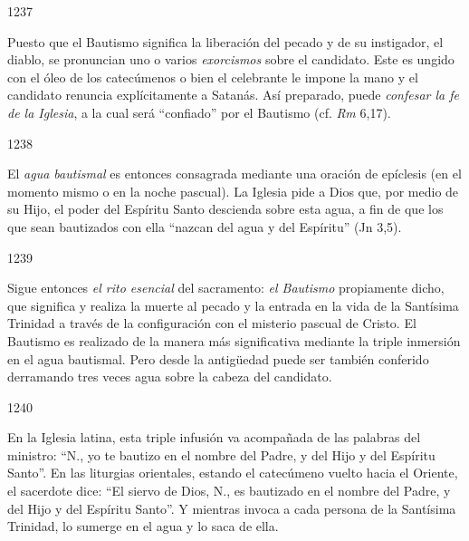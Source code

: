 			\begin{ccebody}\begin{ccenumber}1237\end{ccenumber} Puesto que el Bautismo significa la liberación del pecado y de su instigador, el diablo, se pronuncian uno o varios \textit{exorcismos} sobre el candidato. Este es ungido con el óleo de los catecúmenos o bien el celebrante le impone la mano y el candidato renuncia explícitamente a Satanás. Así preparado, puede \textit{confesar la fe de la Iglesia}, a la cual será “confiado” por el Bautismo (cf. \textit{Rm} 6,17).\end{ccebody}
			
			\begin{ccebody}\begin{ccenumber}1238\end{ccenumber} El \textit{agua bautismal} es entonces consagrada mediante una oración de epíclesis (en el momento mismo o en la noche pascual). La Iglesia pide a Dios que, por medio de su Hijo, el poder del Espíritu Santo descienda sobre esta agua, a fin de que los que sean bautizados con ella “nazcan del agua y del Espíritu” (Jn 3,5).\end{ccebody}
			
			\begin{ccebody}\begin{ccenumber}1239\end{ccenumber} Sigue entonces \textit{el rito esencial} del sacramento: \textit{el Bautismo} propiamente dicho, que significa y realiza la muerte al pecado y la entrada en la vida de la Santísima Trinidad a través de la configuración con el misterio pascual de Cristo. El Bautismo es realizado de la manera más significativa mediante la triple inmersión en el agua bautismal. Pero desde la antigüedad puede ser también conferido derramando tres veces agua sobre la cabeza del candidato.\end{ccebody}
			
			\begin{ccebody}\begin{ccenumber}1240\end{ccenumber} En la Iglesia latina, esta triple infusión va acompañada de las palabras del ministro: “N., yo te bautizo en el nombre del Padre, y del Hijo y del Espíritu Santo”. En las liturgias orientales, estando el catecúmeno vuelto hacia el Oriente, el sacerdote dice: “El siervo de Dios, N., es bautizado en el nombre del Padre, y del Hijo y del Espíritu Santo”. Y mientras invoca a cada persona de la Santísima Trinidad, lo sumerge en el agua y lo saca de ella.\end{ccebody}
			

